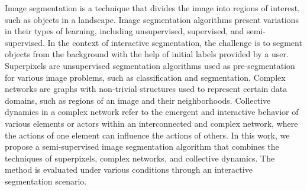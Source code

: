 Image segmentation is a technique that divides the image into regions
of interest, such as objects in a landscape. Image segmentation
algorithms present variations in their types of learning, including
unsupervised, supervised, and semi-supervised. In the context of
interactive segmentation, the challenge is to segment objects from the
background with the help of initial labels provided by a
user. Superpixels are unsupervised segmentation algorithms used as
pre-segmentation for various image problems, such as classification
and segmentation. Complex networks are graphs with non-trivial
structures used to represent certain data domains, such as regions of
an image and their neighborhoods. Collective dynamics in a complex
network refer to the emergent and interactive behavior of various
elements or actors within an interconnected and complex network, where
the actions of one element can influence the actions of others. In
this work, we propose a semi-supervised image segmentation algorithm
that combines the techniques of superpixels, complex networks, and
collective dynamics. The method is evaluated under various conditions
through an interactive segmentation scenario.


